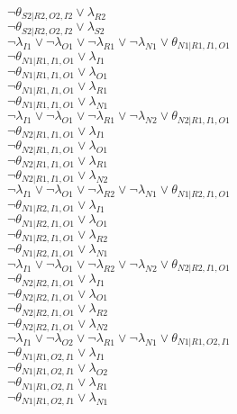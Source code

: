 $\neg\theta_{S2|R2,O2,I2} \vee \lambda_{R2}$\\
$\neg\theta_{S2|R2,O2,I2} \vee \lambda_{S2}$\\
$\neg\lambda_{I1} \vee \neg\lambda_{O1} \vee \neg\lambda_{R1} \vee \neg\lambda_{N1} \vee \theta_{N1|R1,I1,O1}$\\
$\neg\theta_{N1|R1,I1,O1} \vee \lambda_{I1}$\\
$\neg\theta_{N1|R1,I1,O1} \vee \lambda_{O1}$\\
$\neg\theta_{N1|R1,I1,O1} \vee \lambda_{R1}$\\
$\neg\theta_{N1|R1,I1,O1} \vee \lambda_{N1}$\\
$\neg\lambda_{I1} \vee \neg\lambda_{O1} \vee \neg\lambda_{R1} \vee \neg\lambda_{N2} \vee \theta_{N2|R1,I1,O1}$\\
$\neg\theta_{N2|R1,I1,O1} \vee \lambda_{I1}$\\
$\neg\theta_{N2|R1,I1,O1} \vee \lambda_{O1}$\\
$\neg\theta_{N2|R1,I1,O1} \vee \lambda_{R1}$\\
$\neg\theta_{N2|R1,I1,O1} \vee \lambda_{N2}$\\
$\neg\lambda_{I1} \vee \neg\lambda_{O1} \vee \neg\lambda_{R2} \vee \neg\lambda_{N1} \vee \theta_{N1|R2,I1,O1}$\\
$\neg\theta_{N1|R2,I1,O1} \vee \lambda_{I1}$\\
$\neg\theta_{N1|R2,I1,O1} \vee \lambda_{O1}$\\
$\neg\theta_{N1|R2,I1,O1} \vee \lambda_{R2}$\\
$\neg\theta_{N1|R2,I1,O1} \vee \lambda_{N1}$\\
$\neg\lambda_{I1} \vee \neg\lambda_{O1} \vee \neg\lambda_{R2} \vee \neg\lambda_{N2} \vee \theta_{N2|R2,I1,O1}$\\
$\neg\theta_{N2|R2,I1,O1} \vee \lambda_{I1}$\\
$\neg\theta_{N2|R2,I1,O1} \vee \lambda_{O1}$\\
$\neg\theta_{N2|R2,I1,O1} \vee \lambda_{R2}$\\
$\neg\theta_{N2|R2,I1,O1} \vee \lambda_{N2}$\\
$\neg\lambda_{I1} \vee \neg\lambda_{O2} \vee \neg\lambda_{R1} \vee \neg\lambda_{N1} \vee \theta_{N1|R1,O2,I1}$\\
$\neg\theta_{N1|R1,O2,I1} \vee \lambda_{I1}$\\
$\neg\theta_{N1|R1,O2,I1} \vee \lambda_{O2}$\\
$\neg\theta_{N1|R1,O2,I1} \vee \lambda_{R1}$\\
$\neg\theta_{N1|R1,O2,I1} \vee \lambda_{N1}$\\
